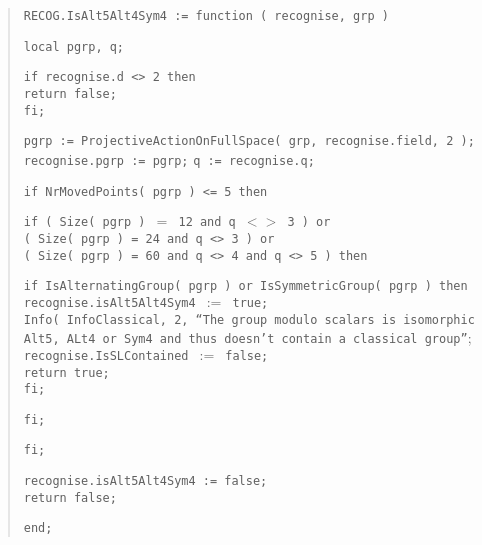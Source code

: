 \documentclass[a4paper,11pt]{article}
\theoremstyle{bla}
\begin{document}
\begin{quote}
\hspace*{-0.3cm} \texttt{RECOG.IsAlt5Alt4Sym4 := function ( recognise, grp )}

  \texttt{local pgrp, q;}

  \texttt{if recognise.d <> 2 then}\\
    \hspace*{0.3cm}\texttt{return false;}\\
  \texttt{fi;}

  \texttt{pgrp := ProjectiveActionOnFullSpace( grp, recognise.field, 2 );}\\
  \texttt{recognise.pgrp := pgrp;}
  \texttt{q := recognise.q;}
 
  \texttt{if NrMovedPoints( pgrp ) <= 5 then}

    \hspace*{0.3cm} \texttt{if ( Size( pgrp ) $=$ 12 and q $<>$ 3 ) or}\\
    \hspace*{0.4cm} \texttt{( Size( pgrp ) = 24 and q <> 3 ) or}\\
    \hspace*{0.4cm} \texttt{( Size( pgrp ) = 60 and q <> 4 and q <> 5 ) then}

      \hspace*{0.6cm}\texttt{if IsAlternatingGroup( pgrp ) or IsSymmetricGroup( pgrp ) then}\\
	\hspace*{0.9cm}\texttt{recognise.isAlt5Alt4Sym4 $:=$ true;}\\
	\hspace*{0.9cm}\texttt{Info( InfoClassical, 2, ``The group modulo scalars is isomorphic}\\
        \hspace*{0.9cm}\texttt{Alt5, ALt4 or Sym4 and thus doesn't contain a classical group''};\\
    	\hspace*{0.9cm}\texttt{recognise.IsSLContained $:=$ false;}\\
    	\hspace*{0.9cm}\texttt{return true;}\\
      \hspace*{0.6cm}\texttt{fi;}

    \hspace*{0.3cm}\texttt{fi;}

   \texttt{fi;}

   \texttt{recognise.isAlt5Alt4Sym4 := false;}\\
   \texttt{return false;}

\hspace*{-0.3cm} \texttt{end;}
\end{quote}
\end{document}
